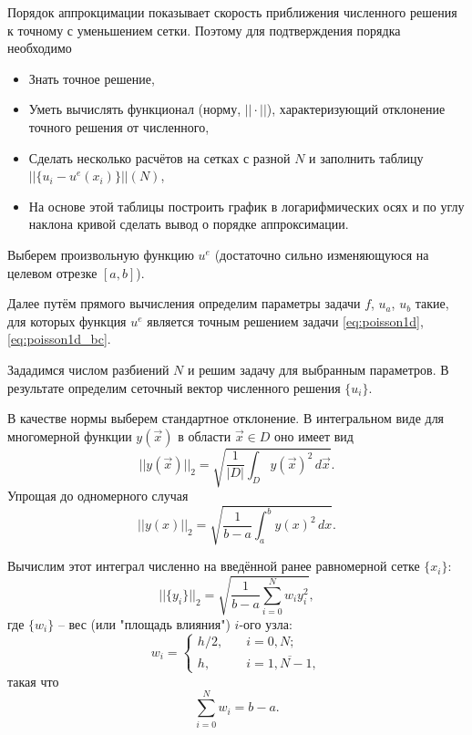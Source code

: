 \label{sec:compute-appr}

Порядок аппрокцимации показывает скорость
приближения численного решения к точному с уменьшением сетки.
Поэтому для подтверждения порядка необходимо
\begin{itemize}
\item Знать точное решение,
\item Уметь вычислять функционал (норму, $||\cdot||$), характеризующий отклонение точного решения от численного,
\item Сделать несколько расчётов на сетках с разной $N$  и заполнить таблицу $||\{u_i - u^e(x_i)\}||(N)$,
\item На основе этой таблицы построить график в логарифмических осях и по углу наклона кривой сделать вывод о порядке аппроксимации.
\end{itemize}

Выберем произвольную функцию $u^e$ (достаточно сильно изменяющуюся на целевом отрезке $[a,b]$).

Далее путём прямого вычисления определим параметры задачи $f$, $u_a$, $u_b$ такие,
для которых функция $u^e$ является точным решением задачи \eqref{eq:poisson1d}, \eqref{eq:poisson1d_bc}.

Зададимся числом разбиений $N$ и решим задачу для выбранным параметров.
В результате определим сеточный вектор численного решения $\{u_i\}$.

В качестве нормы выберем стандартное отклонение. В интегральном виде для многомерной функции $y(\vec x)$
в области $\vec x\in D$ оно имеет вид
\begin{equation}
    \label{eq:norm2_common}
    ||y(\vec x)||_2 = \sqrt{\frac{1}{|D|}\int_{D} y(\vec x)^2 \, d\vec x}.
\end{equation}
Упрощая до одномерного случая
\begin{equation*}
    ||y(x)||_2 = \sqrt{\frac{1}{b-a}\int_{a}^{b} y(x)^2 \, dx}.
\end{equation*}

Вычислим этот интеграл численно на введённой ранее равномерной сетке $\{x_i\}$:
\begin{equation*}
    ||\{y_i\}||_2 = \sqrt{\frac{1}{b-a}\sum_{i=0}^{N} w_i y_i^2},
\end{equation*}
где $\{w_i\}$ -- вес (или "площадь влияния") $i$-ого узла:
\begin{equation*}
    w_i = \begin{cases}
        h/2, &\quad i=0, N;\\
        h, &\quad i=\overline{1,N-1},
    \end{cases}
\end{equation*}
такая что
\begin{equation*}
    \sum_{i=0}^{N} w_i = b-a.
\end{equation*}

